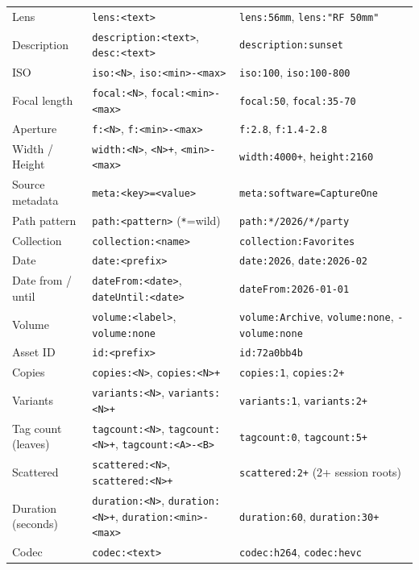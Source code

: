 \documentclass[a4paper,10pt]{extarticle}
\newcommand{\cmd}[1]{\texttt{#1}}
\begin{document}
\begin{tabularx}{\textwidth}{@{}l l X@{}}
Lens                & \cmd{lens:<text>}                     & \cmd{lens:56mm}, \cmd{lens:"RF 50mm"} \\
Description         & \cmd{description:<text>}, \cmd{desc:<text>} & \cmd{description:sunset} \\
ISO                 & \cmd{iso:<N>}, \cmd{iso:<min>-<max>}  & \cmd{iso:100}, \cmd{iso:100-800} \\
Focal length        & \cmd{focal:<N>}, \cmd{focal:<min>-<max>} & \cmd{focal:50}, \cmd{focal:35-70} \\
Aperture            & \cmd{f:<N>}, \cmd{f:<min>-<max>}      & \cmd{f:2.8}, \cmd{f:1.4-2.8} \\
Width / Height      & \cmd{width:<N>}, \cmd{<N>+}, \cmd{<min>-<max>} & \cmd{width:4000+}, \cmd{height:2160} \\
Source metadata     & \cmd{meta:<key>=<value>}              & \cmd{meta:software=CaptureOne} \\
Path pattern        & \cmd{path:<pattern>} (\cmd{*}=wild)   & \cmd{path:*/2026/*/party} \\
Collection          & \cmd{collection:<name>}               & \cmd{collection:Favorites} \\
Date                & \cmd{date:<prefix>}                   & \cmd{date:2026}, \cmd{date:2026-02} \\
Date from / until   & \cmd{dateFrom:<date>}, \cmd{dateUntil:<date>} & \cmd{dateFrom:2026-01-01} \\
Volume              & \cmd{volume:<label>}, \cmd{volume:none} & \cmd{volume:Archive}, \cmd{volume:none}, \cmd{-volume:none} \\
Asset ID            & \cmd{id:<prefix>}                     & \cmd{id:72a0bb4b} \\
Copies              & \cmd{copies:<N>}, \cmd{copies:<N>+}   & \cmd{copies:1}, \cmd{copies:2+} \\
Variants            & \cmd{variants:<N>}, \cmd{variants:<N>+} & \cmd{variants:1}, \cmd{variants:2+} \\
Tag count (leaves)  & \cmd{tagcount:<N>}, \cmd{tagcount:<N>+}, \cmd{tagcount:<A>-<B>} & \cmd{tagcount:0}, \cmd{tagcount:5+} \\
Scattered           & \cmd{scattered:<N>}, \cmd{scattered:<N>+} & \cmd{scattered:2+} (2+ session roots) \\
Duration (seconds)  & \cmd{duration:<N>}, \cmd{duration:<N>+}, \cmd{duration:<min>-<max>} & \cmd{duration:60}, \cmd{duration:30+} \\
Codec               & \cmd{codec:<text>}                    & \cmd{codec:h264}, \cmd{codec:hevc} \\

\end{tabularx}
\end{document}
